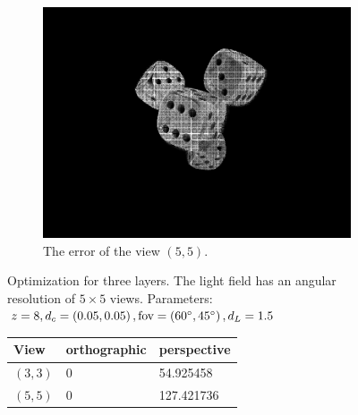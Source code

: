 \documentclass[11pt,a4paper,titlepage]{article}
\begin{document}
\begin{figure}[h]
\begin{subfigure}[t]{0.4\textwidth}
		\includegraphics[width=\textwidth]{results/dice_perspective_rec_3Layers_r=0/custom_view_error.png}
		\caption{The error of the view $\left( 5, 5 \right)$.}
	\end{subfigure}

	\caption{Optimization for three layers. The light field has an angular resolution of $5\times 5$ views. Parameters: $z = 8, d_c = \left( 0.05, 0.05 \right), \text{fov} = \left( 60 \degree, 45\degree \right), d_L = 1.5$}
\end{figure}

\begin{figure}
	\centering
	\begin{tabular}{|l|l|l|}
		\hline 
		View & orthographic & perspective \\ 
		\hline 
		$\left(3, 3\right)$ & 0 & 54.925458 \\ 
		\hline 
		$\left(5, 5\right)$ & 0 & 127.421736 \\ 
		\hline 
	\end{tabular} 
\end{figure}

\newpage
\end{document}
